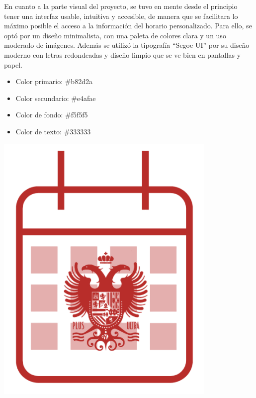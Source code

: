 En cuanto a la parte visual del proyecto, se tuvo en mente desde el principio tener una interfaz usable, intuitiva y accesible, de manera que se facilitara lo máximo posible el acceso a la información del horario personalizado.
\newline\newline
Para ello, se optó por un diseño minimalista, con una paleta de colores clara y un uso moderado de imágenes. Además se utilizó la tipografía ``Segoe UI'' por su diseño moderno con letras redondeadas y diseño limpio que se ve bien en pantallas y papel.
\newline
\begin{center}
\begin{minipage}{0.6\textwidth}
    \begin{itemize}
        \item Color primario: \#b82d2a \colorbox[HTML]{b82d2a}{\hspace{1.5em}} \vspace{0.7em}
        \item Color secundario: \#e4afae \colorbox[HTML]{e4afae}{\hspace{1.5em}} \vspace{0.7em}
        \item Color de fondo: \#f5f5f5 \colorbox[HTML]{f5f5f5}{\hspace{1.5em}} \vspace{0.7em}
        \item Color de texto: \#333333 \colorbox[HTML]{333333}{\hspace{1.5em}}
    \end{itemize}
\end{minipage}%
\hfill
\begin{minipage}{0.35\textwidth}
    \centering
    \captionsetup{justification=centering}
    \includegraphics[width=0.8\textwidth]{figures/logo.png}
    \label{fig:logo}
\end{minipage}
\end{center}
